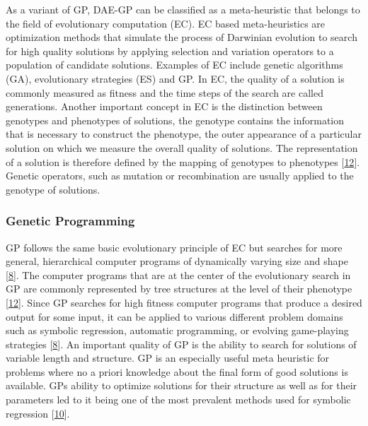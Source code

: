 \documentclass[
  11pt,
]{article}
\begin{document}
As a variant of GP, DAE-GP can be classified as a meta-heuristic that
belongs to the field of evolutionary computation (EC). EC based
meta-heuristics are optimization methods that simulate the process of
Darwinian evolution to search for high quality solutions by applying
selection and variation operators to a population of candidate
solutions. Examples of EC include genetic algorithms (GA), evolutionary
strategies (ES) and GP. In EC, the quality of a solution is commonly
measured as fitness and the time steps of the search are called
generations. Another important concept in EC is the distinction between
genotypes and phenotypes of solutions, the genotype contains the
information that is necessary to construct the phenotype, the outer
appearance of a particular solution on which we measure the overall
quality of solutions. The representation of a solution is therefore
defined by the mapping of genotypes to phenotypes
{[}\protect\hyperlink{ref-design_of_modern_heuristics}{12}{]}. Genetic
operators, such as mutation or recombination are usually applied to the
genotype of solutions.

\hypertarget{genetic-programming}{%
\subsubsection{Genetic Programming}\label{genetic-programming}}

GP follows the same basic evolutionary principle of EC but searches for
more general, hierarchical computer programs of dynamically varying size
and shape {[}\protect\hyperlink{ref-Koza1993GeneticP}{8}{]}. The
computer programs that are at the center of the evolutionary search in
GP are commonly represented by tree structures at the level of their
phenotype {[}\protect\hyperlink{ref-design_of_modern_heuristics}{12}{]}.
Since GP searches for high fitness computer programs that produce a
desired output for some input, it can be applied to various different
problem domains such as symbolic regression, automatic programming, or
evolving game-playing strategies
{[}\protect\hyperlink{ref-Koza1993GeneticP}{8}{]}. An important quality
of GP is the ability to search for solutions of variable length and
structure. GP is an especially useful meta heuristic for problems where
no a priori knowledge about the final form of good solutions is
available. GPs ability to optimize solutions for their structure as well
as for their parameters led to it being one of the most prevalent
methods used for symbolic regression
{[}\protect\hyperlink{ref-10.1007ux2f978-3-540-24621-3_22}{10}{]}.
\end{document}
